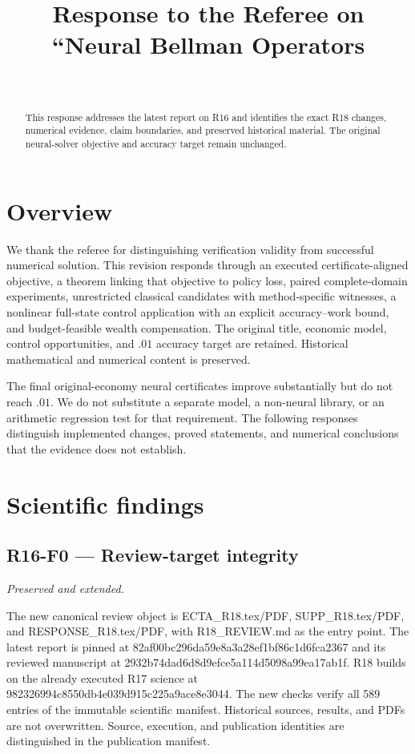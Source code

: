 \documentclass[ecta]{econsocart}
\theoremstyle{remark}
\begin{document}
\begin{frontmatter}
\title{Response to the Referee on ``Neural Bellman Operators\textnormal{}}
\begin{aug}
\author[id=au1,addressref={add1}]{~}
\address[id=add1]{}
\end{aug}
\begin{abstract}
This response addresses the latest report on R16 and identifies the exact R18 changes, numerical evidence, claim boundaries, and preserved historical material. The original neural-solver objective and accuracy target remain unchanged.
\end{abstract}
\end{frontmatter}
\section{Overview}
We thank the referee for distinguishing verification validity from successful numerical solution. This revision responds through an executed certificate-aligned objective, a theorem linking that objective to policy loss, paired complete-domain experiments, unrestricted classical candidates with method-specific witnesses, a nonlinear full-state control application with an explicit accuracy--work bound, and budget-feasible wealth compensation. The original title, economic model, control opportunities, and $.01$ accuracy target are retained. Historical mathematical and numerical content is preserved.

The final original-economy neural certificates improve substantially but do not reach $.01$. We do not substitute a separate model, a non-neural library, or an arithmetic regression test for that requirement. The following responses distinguish implemented changes, proved statements, and numerical conclusions that the evidence does not establish.

\section{Scientific findings}

\subsection{R16-F0 --- Review-target integrity}
\noindent\emph{Preserved and extended.}

The new canonical review object is ECTA\_R18.tex/PDF, SUPP\_R18.tex/PDF, and RESPONSE\_R18.tex/PDF, with R18\_REVIEW.md as the entry point. The latest report is pinned at 82af00bc296da59e8a3a28ef1bf86c1d6fca2367 and its reviewed manuscript at 2932b74dad6d8d9efce5a114d5098a99ea17ab1f. R18 builds on the already executed R17 science at 982326994c8550db4e039d915c225a9ace8e3044. The new checks verify all 589 entries of the immutable scientific manifest. Historical sources, results, and PDFs are not overwritten. Source, execution, and publication identities are distinguished in the publication manifest.
\end{document}
